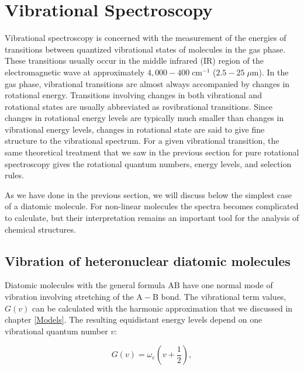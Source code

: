 \documentclass[
  9pt,
]{extbook}
\theoremstyle{definition}
\theoremstyle{definition}
\theoremstyle{definition}
\theoremstyle{remark}
\begin{document}
\hypertarget{vibrational-spectroscopy}{%
\section{Vibrational Spectroscopy}\label{vibrational-spectroscopy}}

Vibrational spectroscopy is concerned with the measurement of the energies of transitions between quantized vibrational states of molecules in the gas phase. These transitions usually occur in the middle infrared (IR) region of the electromagnetic wave at approximately \(4,000-400\;\text{cm}^{-1}\) (\(2.5-25\;\mu \text{m}\)). In the gas phase, vibrational transitions are almost always accompanied by changes in rotational energy. Transitions involving changes in both vibrational and rotational states are usually abbreviated as rovibrational transitions. Since changes in rotational energy levels are typically much smaller than changes in vibrational energy levels, changes in rotational state are said to give fine structure to the vibrational spectrum. For a given vibrational transition, the same theoretical treatment that we saw in the previous section for pure rotational spectroscopy gives the rotational quantum numbers, energy levels, and selection rules.

As we have done in the previous section, we will discuss below the simplest case of a diatomic molecule. For non-linear molecules the spectra becomes complicated to calculate, but their interpretation remains an important tool for the analysis of chemical structures.

\hypertarget{vibration-of-heteronuclear-diatomic-molecules}{%
\subsection{Vibration of heteronuclear diatomic molecules}\label{vibration-of-heteronuclear-diatomic-molecules}}

Diatomic molecules with the general formula \(\mathrm{AB}\) have one normal mode of vibration involving stretching of the \(\mathrm{A}-\mathrm{B}\) bond. The vibrational term values, \(G(v)\) can be calculated with the harmonic approximation that we discussed in chapter \ref{Models}. The resulting equidistant energy levels depend on one vibrational quantum number \(v\):

\begin{equation}
G(v) = \omega_e \left( v + \frac{1}{2} \right),
\label{eq:vib1}
\end{equation}
\end{document}
